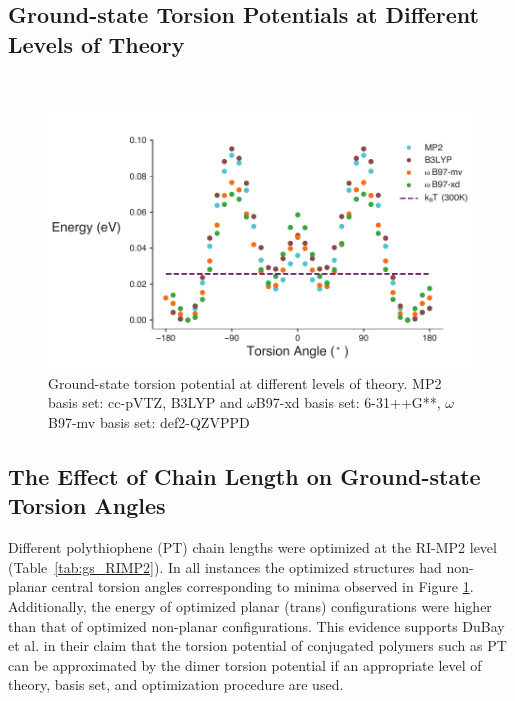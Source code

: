\subsection{Ground-state Torsion Potentials at Different Levels of Theory}
\
\begin{figure}[hbt!]
    \centering
    \includegraphics{figures/append_tor_model/SI_compare_theory_torsion.pdf}
    \caption{Ground-state torsion potential at different levels of theory. MP2 basis set: cc-pVTZ, B3LYP and $\omega$B97-xd basis set: 6-31++G**, $\omega$B97-mv basis set: def2-QZVPPD}
    \label{fig:gs_theory}
\end{figure}

\subsection{The Effect of Chain Length on Ground-state Torsion Angles}
\label{subsec:chain_length_gs}

Different polythiophene (PT) chain lengths were optimized at the RI-MP2 level (Table~\ref{tab:gs_RIMP2}). In all instances the optimized structures had non-planar central torsion angles corresponding to minima observed in Figure \ref{fig:gs_theory}. Additionally, the energy of optimized planar (trans) configurations were higher than that of optimized non-planar configurations. This evidence supports DuBay et al. in their claim that the torsion potential of conjugated polymers such as PT can be approximated by the dimer torsion potential if an appropriate level of theory, basis set, and optimization procedure are used.\cite{Dubay2012}

